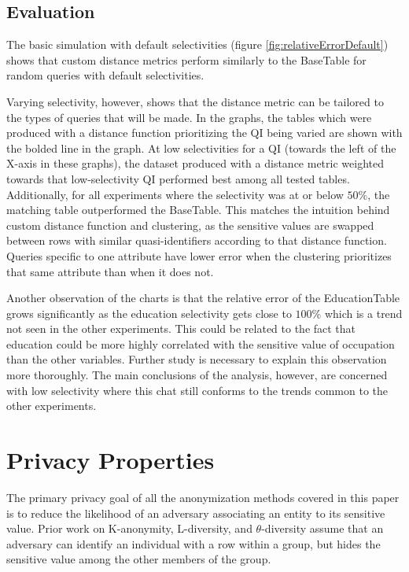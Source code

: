 \subsection{Evaluation}

The basic simulation with default selectivities (figure \ref{fig:relativeErrorDefault}) shows that custom distance metrics perform similarly to the BaseTable for random queries with default selectivities.

Varying selectivity, however, shows that the distance metric can be tailored to the types of queries that will be made. In the graphs, the tables which were produced with a distance function prioritizing the QI being varied are shown with the bolded line in the graph. At low selectivities for a QI (towards the left of the X-axis in these graphs), the dataset produced with a distance metric weighted towards that low-selectivity QI performed best among all tested tables. Additionally, for all experiments where the selectivity was at or below $50\%$, the matching table outperformed the BaseTable. This matches the intuition behind custom distance function and clustering, as the sensitive values are swapped between rows with similar quasi-identifiers according to that distance function. Queries specific to one attribute have lower error when the clustering prioritizes that same attribute than when it does not.

Another observation of the charts is that the relative error of the EducationTable grows significantly as the education selectivity gets close to $100\%$ which is a trend not seen in the other experiments. This could be related to the fact that education could be more highly correlated with the sensitive value of occupation than the other variables. Further study is necessary to explain this observation more thoroughly. The main conclusions of the analysis, however, are concerned with low selectivity where this chat still conforms to the trends common to the other experiments.

\section{Privacy Properties}
The primary privacy goal of all the anonymization methods covered in this paper is to reduce the likelihood of an adversary associating an entity to its sensitive value. Prior work on K-anonymity, L-diversity, and $\theta$-diversity assume that an adversary can identify an individual with a row within a group, but hides the sensitive value among the other members of the group.

